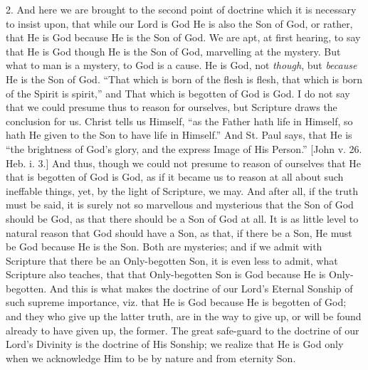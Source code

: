 2. And here we are brought to the second point of doctrine which it
is necessary to insist upon, that while our Lord is God He is also the
Son of God, or rather, that He is God because He is the Son of God. We
are apt, at first hearing, to say that He is God though He is the Son of
God, marvelling at the mystery. But what to man is a mystery, to God is
a cause. He is God, not \emph{though}, but \emph{because} He is the Son
of God. ``That which is born of the flesh is flesh, that which is
born of the Spirit is spirit,'' and That which is begotten of God is
God. I do not say that we could presume thus to reason for ourselves,
but Scripture draws the conclusion for us. Christ tells us Himself,
``as the Father hath life in Himself, so hath He given to the Son to
have life in Himself.'' And St. Paul says, that He is ``the
brightness of God's glory, and the express Image of His Person.''
[John v. 26. Heb. i. 3.] And thus, though we could not presume to reason
of ourselves that He that is begotten of God is God, as if it became us
to reason at all about such ineffable things, yet, by the light of
Scripture, we may. And after all, if the truth must be said, it is
surely not so marvellous and mysterious that the Son of God should be
God, as that there should be a Son of God at all. It is as little level
to natural reason that God should have a Son, as that, if there be a
Son, He must be God because He is the Son. Both are mysteries; and if we
admit with Scripture that there be an Only-begotten Son, it is even less
to admit, what Scripture also teaches, that that Only-begotten Son is
God because He is Only-begotten. And this is what makes the doctrine of
our Lord's Eternal Sonship of such supreme importance, viz. that He is
God because He is begotten of God; and they who give up the latter truth, are in the way to give up, or will be found already to have given
up, the former. The great safe-guard to the doctrine of our Lord's
Divinity is the doctrine of His Sonship; we realize that He is God only
when we acknowledge Him to be by nature and from eternity Son.

